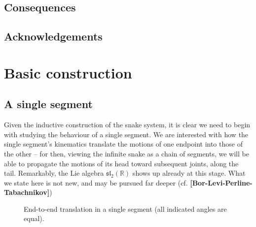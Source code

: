 \documentclass{article}
\def\fsl{\mathfrak{sl}}
\def\RR{\mathbb{R}}
\theoremstyle{definition}
\begin{document}
\subsection{Consequences}

\subsection{Acknowledgements}


\section{Basic construction}
\label{sec:basic}
\subsection{A single segment}
Given the inductive construction of the snake system,
it is clear we need to begin with studying the behaviour of a single
segment. We are interested with how the single segment's kinematics
translate the motions of one endpoint into those of the other -- for then,
viewing the infinite snake as a chain of segments, we will be able
to propagate the motions of its head toward subsequent joints, along the tail. 
Remarkably, the Lie algebra $\fsl_2(\RR)$ shows up already at this stage. 
What
we state here is not new, and may be pursued far deeper (cf. {\bf[Bor-Levi-Perline-Tabachnikov]})

\begin{figure} %
        \begin{center}\end{center}
        \caption{End-to-end translation in a single segment (all indicated angles
        are equal).\label{fig:seg}}
\end{figure}
\end{document}
